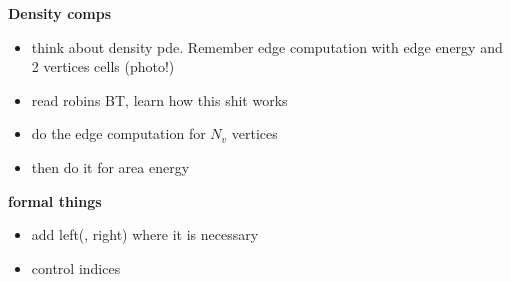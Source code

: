 \textbf{Density comps}
\begin{itemize}
    \item think about density pde. Remember edge computation with edge energy and 2 vertices cells (photo!)
    \item read robins BT, learn how this shit works 
    \item do the edge computation for $N_v$ vertices 
    \item then do it for area energy       
\end{itemize}

\textbf{formal things}
\begin{itemize}
    \item add left(, right) where it is necessary 
    \item control indices 
\end{itemize}